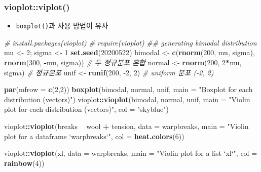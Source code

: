 \documentclass[
  11pt,
]{krantz}
\newenvironment{Shaded}{\begin{snugshade}}{\end{snugshade}}
\newcommand{\CommentTok}[1]{\textcolor[rgb]{0.37,0.37,0.37}{\textit{#1}}}
\newcommand{\DataTypeTok}[1]{\textcolor[rgb]{0.27,0.27,0.27}{#1}}
\newcommand{\DecValTok}[1]{\textcolor[rgb]{0.06,0.06,0.06}{#1}}
\newcommand{\KeywordTok}[1]{\textcolor[rgb]{0.27,0.27,0.27}{\textbf{#1}}}
\newcommand{\NormalTok}[1]{#1}
\newcommand{\OperatorTok}[1]{\textcolor[rgb]{0.43,0.43,0.43}{\textbf{#1}}}
\newcommand{\StringTok}[1]{\textcolor[rgb]{0.5,0.5,0.5}{#1}}
\providecommand{\tightlist}{%
  \setlength{\itemsep}{0pt}\setlength{\parskip}{0pt}}
\begin{document}
\hypertarget{vioplot}{%
\subsubsection*{\texorpdfstring{\textbf{vioplot::viplot()}}{vioplot::viplot()}}\label{vioplot}}


\begin{itemize}
\tightlist
\item
  \texttt{boxplot()}과 사용 방법이 유사
\end{itemize}

\footnotesize

\begin{Shaded}
\begin{Highlighting}[]
\CommentTok{# install.packages(vioplot)}
\CommentTok{# require(vioplot)}
\CommentTok{## generating bimodal distribution}
\NormalTok{mu <-}\StringTok{ }\DecValTok{2}\NormalTok{; sigma <-}\StringTok{ }\DecValTok{1}
\KeywordTok{set.seed}\NormalTok{(}\DecValTok{20200522}\NormalTok{)}
\NormalTok{bimodal <-}\StringTok{ }\KeywordTok{c}\NormalTok{(}\KeywordTok{rnorm}\NormalTok{(}\DecValTok{200}\NormalTok{, mu, sigma), }
             \KeywordTok{rnorm}\NormalTok{(}\DecValTok{300}\NormalTok{, }\OperatorTok{-}\NormalTok{mu, sigma)) }\CommentTok{# 두 정규분포 혼합}
\NormalTok{normal <-}\StringTok{ }\KeywordTok{rnorm}\NormalTok{(}\DecValTok{200}\NormalTok{, }\DecValTok{2}\OperatorTok{*}\NormalTok{mu, sigma) }\CommentTok{# 정규분포}
\NormalTok{unif <-}\StringTok{ }\KeywordTok{runif}\NormalTok{(}\DecValTok{200}\NormalTok{, }\DecValTok{-2}\NormalTok{, }\DecValTok{2}\NormalTok{) }\CommentTok{# uniform 분포 (-2, 2)}

\KeywordTok{par}\NormalTok{(}\DataTypeTok{mfrow =} \KeywordTok{c}\NormalTok{(}\DecValTok{2}\NormalTok{,}\DecValTok{2}\NormalTok{))}
\KeywordTok{boxplot}\NormalTok{(bimodal, normal, unif, }
        \DataTypeTok{main =} \StringTok{"Boxplot for each distribution (vectors)"}\NormalTok{)}
\NormalTok{vioplot}\OperatorTok{::}\KeywordTok{vioplot}\NormalTok{(bimodal, normal, unif, }
                 \DataTypeTok{main =} \StringTok{"Violin plot for each distribution (vectors)"}\NormalTok{, }
                 \DataTypeTok{col =} \StringTok{"skyblue"}\NormalTok{)}

\NormalTok{vioplot}\OperatorTok{::}\KeywordTok{vioplot}\NormalTok{(breaks }\OperatorTok{~}\StringTok{ }\NormalTok{wool }\OperatorTok{+}\StringTok{ }\NormalTok{tension, }
                 \DataTypeTok{data =}\NormalTok{ warpbreaks, }
                 \DataTypeTok{main =} \StringTok{"Violin plot for a dataframe `warpbreaks`"}\NormalTok{, }
                 \DataTypeTok{col =} \KeywordTok{heat.colors}\NormalTok{(}\DecValTok{6}\NormalTok{))}

\NormalTok{vioplot}\OperatorTok{::}\KeywordTok{vioplot}\NormalTok{(xl, }
                \DataTypeTok{data =}\NormalTok{ warpbreaks, }
                \DataTypeTok{main =} \StringTok{"Violin plot for a list `xl`"}\NormalTok{, }
                \DataTypeTok{col =} \KeywordTok{rainbow}\NormalTok{(}\DecValTok{4}\NormalTok{))}
\end{Highlighting}
\end{Shaded}
\end{document}
